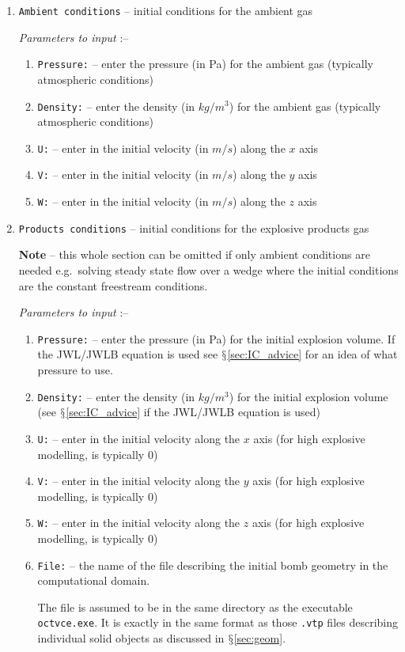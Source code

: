\documentclass[pdftex, 12pt, a4paper]{report}
\begin{document}
\begin{enumerate}
\item \verb'Ambient conditions' -- initial conditions for the ambient gas

\emph{Parameters to input} :--
\begin{enumerate}
  \item \verb'Pressure:' -- enter the pressure (in Pa) for the ambient gas (typically atmospheric conditions)
  \item \verb'Density:' -- enter the density (in $kg/m^3$) for the ambient gas (typically atmospheric conditions)
  \item \verb'U:' -- enter in the initial velocity (in $m/s$) along the $x$ axis 
  \item \verb'V:' -- enter in the initial velocity (in $m/s$) along the $y$ axis 
  \item \verb'W:' -- enter in the initial velocity (in $m/s$) along the $z$ axis 
\end{enumerate}

\item \verb'Products conditions' -- initial conditions for the explosive products gas

\textbf{Note} -- this whole section can be omitted if only ambient conditions are needed e.g.\ solving steady
state flow over a wedge where the initial conditions are the constant freestream conditions.

\emph{Parameters to input} :--
\begin{enumerate}
  \item \verb'Pressure:' -- enter the pressure (in Pa) for the initial explosion volume.  If the JWL/JWLB equation is 
    used see $\mathsection$\ref{sec:IC_advice} for an idea of what pressure to use.
  \item \verb'Density:' -- enter the density (in $kg/m^3$) for the initial explosion volume (see $\mathsection$\ref{sec:IC_advice}
    if the JWL/JWLB equation is used)
  \item \verb'U:' -- enter in the initial velocity along the $x$ axis (for high explosive modelling, is typically 0)
  \item \verb'V:' -- enter in the initial velocity along the $y$ axis (for high explosive modelling, is typically 0)
  \item \verb'W:' -- enter in the initial velocity along the $z$ axis (for high explosive modelling, is typically 0)
  \item \verb'File:' -- the name of the file describing the initial bomb geometry in the computational domain.

    The file is assumed to be in the same directory as the executable \verb'octvce.exe'.  It is exactly in the same
    format as those \verb'.vtp' files describing individual solid objects as discussed in $\mathsection$\ref{sec:geom}. 
\end{enumerate}
\end{enumerate}
\end{document}
